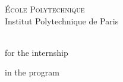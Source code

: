 \begin{titlepage}
  \onehalfspacing
  \makeatletter
  \vspace*{1em}
  \begin{center}
    {\LARGE\textsc{École Polytechnique}}\\[0.2em]
    {\Large Institut Polytechnique de Paris}

    \par\vspace{3em}
    {%
      \@subject\\
      for the \@course \space internship\par
      in the \@degree \space program
    }

    \vfill
    {\@title}
    
    \par\vspace{2em}
    {\@author}
  \end{center}
  \makeatother


\end{titlepage}
